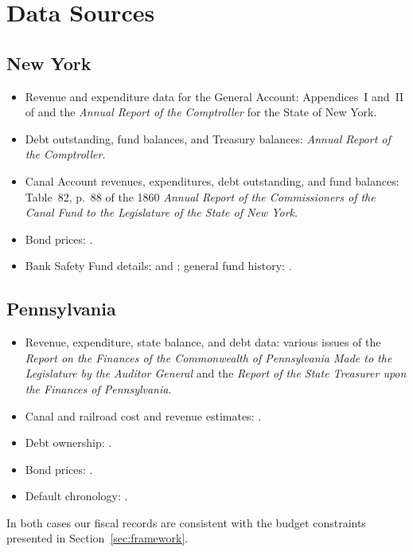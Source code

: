 \documentclass[11pt]{article}
\begin{document}
\section{Data Sources}
\label{sec:data}

\subsection*{New York}
\begin{itemize}
  \item Revenue and expenditure data for the General Account: Appendices~I
    and~II of \citet{Sowers_1914} and the \emph{Annual Report of the
    Comptroller} for the State of New York.
  \item Debt outstanding, fund balances, and Treasury balances: \emph{Annual
    Report of the Comptroller}.
  \item Canal Account revenues, expenditures, debt outstanding, and fund
    balances: Table~82, p.~88 of the 1860 \emph{Annual Report of the
    Commissioners of the Canal Fund to the Legislature of the State of New
    York}.
  \item Bond prices: \citet{Sylla_Wilson_Wright}.
  \item Bank Safety Fund details: \citet{Chaddock_1910} and
    \citet{Bodenhorn_1996}; general fund history: \citet{Roberts_1897}.
\end{itemize}

\subsection*{Pennsylvania}
\begin{itemize}
  \item Revenue, expenditure, state balance, and debt data: various issues of
    the \emph{Report on the Finances of the Commonwealth of Pennsylvania Made
    to the Legislature by the Auditor General} and the \emph{Report of the
    State Treasurer upon the Finances of Pennsylvania}.
  \item Canal and railroad cost and revenue estimates: \citet{penn_pub_works_cost_1854}.
  \item Debt ownership: \citet{holders_state_debt_1842}.
  \item Bond prices: \citet{Sylla_Wilson_Wright}.
  \item Default chronology: \citet{English_1996}.
\end{itemize}

In both cases our fiscal records are consistent with the budget constraints
presented in Section~\ref{sec:framework}.

\clearpage

\end{document}
